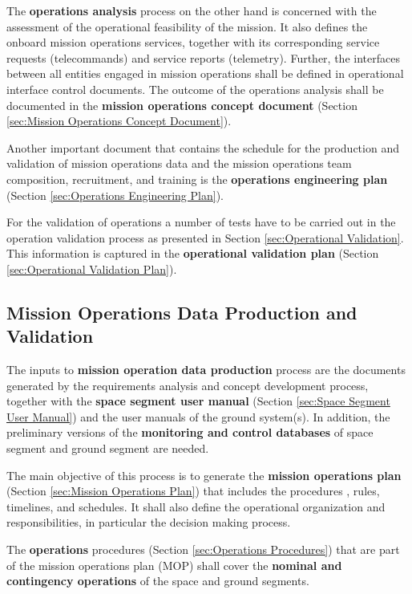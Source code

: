 The \textbf{operations analysis} process on the other hand is concerned with the assessment of the operational feasibility of the mission. It also defines the onboard mission operations services, together with its corresponding service requests (telecommands) and service reports (telemetry). Further, the interfaces between all entities engaged in mission operations shall be defined in operational interface control documents. The outcome of the operations analysis shall be documented in the \textbf{mission operations concept document} (Section \ref{sec:Mission Operations Concept Document}).

Another important document that contains the schedule for the production and validation of mission operations data and the mission operations team composition, recruitment, and training is the \textbf{operations engineering plan} (Section \ref{sec:Operations Engineering Plan}).

For the validation of operations a number of tests have to be carried out in the operation validation process as presented in Section \ref{sec:Operational Validation}. This information is captured in the \textbf{operational validation plan} (Section \ref{sec:Operational Validation Plan}).

\subsection{Mission Operations Data Production and Validation}

The inputs to \textbf{mission operation data production} process are the documents generated by the requirements analysis and concept development process, together with the \textbf{space segment user manual} (Section \ref{sec:Space Segment User Manual}) and the user manuals of the ground system(s). In addition, the preliminary versions of the \textbf{monitoring and control databases} of space segment and ground segment are needed.

The main objective of this process is to generate the \textbf{mission operations plan} (Section \ref{sec:Mission Operations Plan}) that includes the procedures , rules, timelines, and schedules. It shall also define the operational organization and responsibilities, in particular the decision making process.

The \textbf{operations} procedures (Section \ref{sec:Operations Procedures}) that are part of the mission operations plan (MOP) shall cover the \textbf{nominal and contingency operations} of the space and ground segments.

